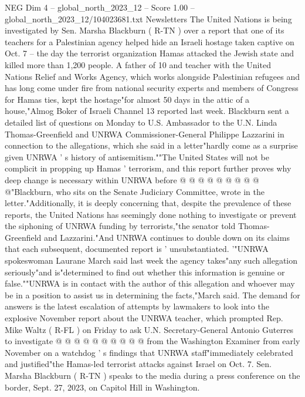\begin{textsample}{NEG Dim 4 – global\_north\_2023\_12 – Score 1.00 – global\_north\_2023\_12/104023681.txt}  \label{ex:f4_neg_150}
Newsletters The United Nations is being investigated by Sen.
Marsha Blackburn ( R-TN ) over a report that one of its teachers for a Palestinian agency helped hide an Israeli hostage taken captive on Oct. 7 -- the day the terrorist organization Hamas attacked the Jewish state and killed more than 1,200 people.
A father of 10 and teacher with the United Nations Relief and Works Agency, which works alongside Palestinian refugees and has long come under fire from national security experts and members of Congress for Hamas ties, kept the hostage"for almost 50 days in the attic of a house,"Almog Boker of Israeli Channel 13 reported last week.
Blackburn sent a detailed list of questions on Monday to U.S.
Ambassador to the U.N.
Linda Thomas-Greenfield and UNRWA Commissioner-General Philippe Lazzarini in connection to the allegations, which she said in a letter"hardly come as a surprise given UNRWA ' s history of antisemitism.""The United States will not be complicit in propping up Hamas ' terrorism, and this report further proves why deep change is necessary within UNRWA before @ @ @ @ @ @ @ @ @ @"Blackburn, who sits on the Senate Judiciary Committee, wrote in the letter."Additionally, it is deeply concerning that, despite the prevalence of these reports, the United Nations has seemingly done nothing to investigate or prevent the siphoning of UNRWA funding by terrorists,"the senator told Thomas-Greenfield and Lazzarini."And UNRWA continues to double down on its claims that each subsequent, documented report is ' unsubstantiated. '"UNRWA spokeswoman Laurane March said last week the agency takes"any such allegation seriously"and is"determined to find out whether this information is genuine or false.""UNRWA is in contact with the author of this allegation and whoever may be in a position to assist us in determining the facts,"March said.
The demand for answers is the latest escalation of attempts by lawmakers to look into the explosive November report about the UNRWA teacher, which prompted Rep.
Mike Waltz ( R-FL ) on Friday to ask U.N.
Secretary-General Antonio Guterres to investigate @ @ @ @ @ @ @ @ @ @ from the Washington Examiner from early November on a watchdog ' s findings that UNRWA staff"immediately celebrated and justified"the Hamas-led terrorist attacks against Israel on Oct. 7.
Sen.
Marsha Blackburn ( R-TN ) speaks to the media during a press conference on the border, Sept. 27, 2023, on Capitol Hill in Washington.

\end{textsample}
